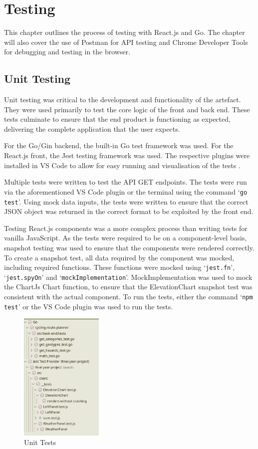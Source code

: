 \chapter{Testing}
\label{chap:testing}

This chapter outlines the process of testing with React.js and Go. The chapter will also cover the use of Postman for API testing and Chrome Developer Tools for debugging and testing in the browser.

\section{Unit Testing}
\label{testing:unit}

Unit testing was critical to the development and functionality of the artefact. They were used primarily to test the core logic of the front and back end. These tests culminate to ensure that the end product is functioning as expected, delivering the complete application that the user expects.

For the Go/Gin backend, the built-in Go test framework was used. For the React.js front, the Jest testing framework was used. The respective plugins were installed in VS Code to allow for easy running and visualisation of the tests .

Multiple tests were written to test the API GET endpoints. The tests were run via the aforementioned VS Code plugin or the terminal using the command `\texttt{go test}'. Using mock data inputs, the tests were written to ensure that the correct JSON object was returned in the correct format to be exploited by the front end.

Testing React.js components was a more complex process than writing tests for vanilla JavaScript. As the tests were required to be on a component-level basis, snapshot testing was used to ensure that the components were rendered correctly. To create a snapshot test, all data required by the component was mocked, including required functions. These functions were mocked using `\texttt{jest.fn}', `\texttt{jest.spyOn}' and `\texttt{mockImplementation}'. MockImplementation was used to mock the ChartJs Chart function, to ensure that the ElevationChart snapshot test was consistent with the actual component. To run the tests, either the command `\texttt{npm test}' or the VS Code plugin was used to run the tests.

\begin{figure}[!ht]
    \centering
    \includegraphics[width=150px]{figures/unit-tests.png}
    \caption{Unit Tests}
    \label{fig:unit-tests}
  \end{figure}

